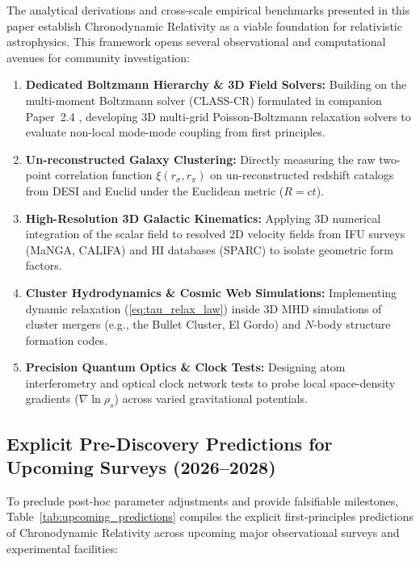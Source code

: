 \documentclass[aps,prd,reprint,superscriptaddress,nofootinbib,floatfix,amsmath,amssymb]{revtex4-2}
\begin{document}
The analytical derivations and cross-scale empirical benchmarks presented in this paper establish Chronodynamic Relativity as a viable foundation for relativistic astrophysics. This framework opens several observational and computational avenues for community investigation:

\begin{enumerate}
    \item \textbf{Dedicated Boltzmann Hierarchy \& 3D Field Solvers:} Building on the multi-moment Boltzmann solver (\textsc{CLASS-CR}) formulated in companion Paper~2.4 \cite{Shreve2026_CMB}, developing 3D multi-grid Poisson-Boltzmann relaxation solvers to evaluate non-local mode-mode coupling from first principles.
    \item \textbf{Un-reconstructed Galaxy Clustering:} Directly measuring the raw two-point correlation function $\xi(r_\sigma, r_\pi)$ on un-reconstructed redshift catalogs from DESI and Euclid under the Euclidean metric ($R = c t$).
    \item \textbf{High-Resolution 3D Galactic Kinematics:} Applying 3D numerical integration of the scalar field to resolved 2D velocity fields from IFU surveys (MaNGA, CALIFA) and HI databases (SPARC) to isolate geometric form factors.
    \item \textbf{Cluster Hydrodynamics \& Cosmic Web Simulations:} Implementing dynamic relaxation (\ref{eq:tau_relax_law}) inside 3D MHD simulations of cluster mergers (e.g., the Bullet Cluster, El Gordo) and $N$-body structure formation codes.
    \item \textbf{Precision Quantum Optics \& Clock Tests:} Designing atom interferometry and optical clock network tests to probe local space-density gradients ($\nabla\ln\rho_s$) across varied gravitational potentials.
\end{enumerate}

\subsection{Explicit Pre-Discovery Predictions for Upcoming Surveys (2026--2028)}
\label{subsec:predictions}

To preclude post-hoc parameter adjustments and provide falsifiable milestones, Table~\ref{tab:upcoming_predictions} compiles the explicit first-principles predictions of Chronodynamic Relativity across upcoming major observational surveys and experimental facilities:
\end{document}

